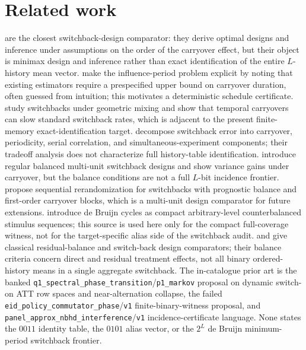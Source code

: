 \documentclass[11pt]{article}
\theoremstyle{definition}
\theoremstyle{plain}
\theoremstyle{remark}
\begin{document}
\section{Related work}
\citet{BojinovSimchiLeviZhao2023} are the closest switchback-design comparator: they derive optimal designs and inference under assumptions on the order of the carryover effect, but their object is minimax design and inference rather than exact identification of the entire \(L\)-history mean vector.
\citet{MissaultMasoero2025} make the influence-period problem explicit by noting that existing estimators require a prespecified upper bound on carryover duration, often guessed from intuition; this motivates a deterministic schedule certificate.
\citet{HuWager2022} study switchbacks under geometric mixing and show that temporal carryovers can slow standard switchback rates, which is adjacent to the present finite-memory exact-identification target.
\citet{XiongChinTaylor2024} decompose switchback error into carryover, periodicity, serial correlation, and simultaneous-experiment components; their tradeoff analysis does not characterize full history-table identification.
\citet{MissaultMasoeroDelbeRichardsonImbens2025} introduce regular balanced multi-unit switchback designs and show variance gains under carryover, but the balance conditions are not a full \(L\)-bit incidence frontier.
\citet{ZengEtAl2026} propose sequential rerandomization for switchbacks with prognostic balance and first-order carryover blocks, which is a multi-unit design comparator for future extensions.
\citet{AguirreMattarMagisWeinberg2011} introduce de Bruijn cycles as compact arbitrary-level counterbalanced stimulus sequences; this source is used here only for the compact full-coverage witness, not for the target-specific alias side of the switchback audit.
\citet{Williams1949} and \citet{OmanSeiden1988} give classical residual-balance and switch-back design comparators; their balance criteria concern direct and residual treatment effects, not all binary ordered-history means in a single aggregate switchback.
The in-catalogue prior art is the banked \texttt{q1\_spectral\_phase\_transition}/\texttt{p1\_markov} proposal on dynamic switch-on ATT row spaces and near-alternation collapse, the failed \texttt{eid\_policy\_commutator\_phase}/\texttt{v1} finite-binary-witness proposal, and \texttt{panel\_approx\_nbhd\_interference}/\texttt{v1} incidence-certificate language. None states the \(0011\) identity table, the \(0101\) alias vector, or the \(2^L\) de Bruijn minimum-period switchback frontier.
\end{document}
